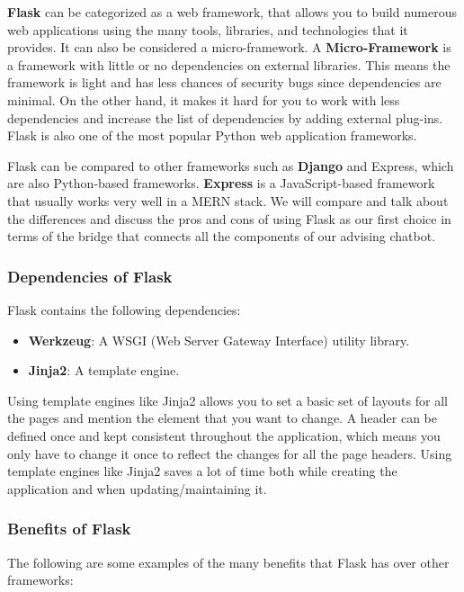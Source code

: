 \documentclass[titlepage, 12pt]{article}
\begin{document}
\textbf{Flask} can be categorized as a web framework, that allows you to build numerous web applications using the many tools, libraries, and technologies that it provides. It can also be considered a micro-framework. A \textbf{Micro-Framework} is a framework with little or no dependencies on external libraries. This means the framework is light and has less chances of security bugs since dependencies are minimal. On the other hand, it makes it hard for you to work with less dependencies and increase the list of dependencies by adding external plug-ins. Flask is also one of the most popular Python web application frameworks.

Flask can be compared to other frameworks such as \textbf{Django} and Express, which are also Python-based frameworks. \textbf{Express} is a JavaScript-based framework that usually works very well in a MERN stack. We will compare and talk about the differences and discuss the pros and cons of using Flask as our first choice in terms of the bridge that connects all the components of our advising chatbot.

\subsubsection{Dependencies of Flask}

Flask contains the following dependencies:

\begin{itemize}
    \item \textbf{Werkzeug}: A WSGI (Web Server Gateway Interface) utility library.
    \item \textbf{Jinja2}: A template engine.
\end{itemize}
 
Using template engines like Jinja2 allows you to set a basic set of layouts for all the pages and mention the element that you want to change. A header can be defined once and kept consistent throughout the application, which means you only have to change it once to reflect the changes for all the page headers. Using template engines like Jinja2 saves a lot of time both while creating the application and when updating/maintaining it.

\subsubsection{Benefits of Flask}

The following are some examples of the many benefits that Flask has over other frameworks:
\end{document}
